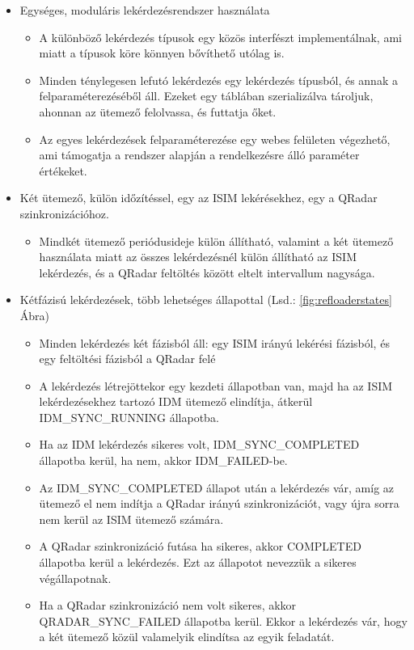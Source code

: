 \begin{itemize}
	\item Egységes, moduláris lekérdezésrendszer használata
	\begin{itemize}
		\item A különböző lekérdezés típusok egy közös interfészt implementálnak, ami miatt a típusok köre könnyen bővíthető utólag is.
		\item Minden ténylegesen lefutó lekérdezés egy lekérdezés típusból, és annak a felparaméterezéséből áll. Ezeket egy táblában szerializálva tároljuk, ahonnan az ütemező felolvassa, és futtatja őket.
		\item Az egyes lekérdezések felparaméterezése egy webes felületen végezhető, ami támogatja a rendszer alapján a rendelkezésre álló paraméter értékeket.
	\end{itemize}
	
	\item Két ütemező, külön időzítéssel, egy az ISIM lekérésekhez, egy a QRadar szinkronizációhoz.
		\begin{itemize}
		\item Mindkét ütemező periódusideje külön állítható, valamint a két ütemező használata miatt az összes lekérdezésnél külön állítható az ISIM lekérdezés, és a QRadar feltöltés között eltelt intervallum nagysága.
	\end{itemize}
	
	\item Kétfázisú lekérdezések, több lehetséges állapottal (Lsd.: \ref{fig:refloaderstates} Ábra)
	\begin{itemize}
		\item Minden lekérdezés két fázisból áll: egy ISIM irányú lekérési fázisból, és egy feltöltési fázisból a QRadar felé
		\item A lekérdezés létrejöttekor egy kezdeti állapotban van, majd ha az ISIM lekérdezésekhez tartozó IDM ütemező elindítja, átkerül IDM\_SYNC\_RUNNING állapotba.
		\item Ha az IDM lekérdezés sikeres volt, IDM\_SYNC\_COMPLETED állapotba kerül, ha nem, akkor IDM\_FAILED-be.
		\item Az IDM\_SYNC\_COMPLETED állapot után a lekérdezés vár, amíg az ütemező el nem indítja a QRadar irányú szinkronizációt, vagy újra sorra nem kerül az ISIM ütemező számára.
		\item A QRadar szinkronizáció futása ha sikeres, akkor COMPLETED állapotba kerül a lekérdezés. Ezt az állapotot nevezzük a sikeres végállapotnak.
		\item Ha a QRadar szinkronizáció nem volt sikeres, akkor QRADAR\_SYNC\_FAILED állapotba kerül. Ekkor a lekérdezés vár, hogy a két ütemező közül valamelyik elindítsa az egyik feladatát.
	\end{itemize}


\end{itemize}
